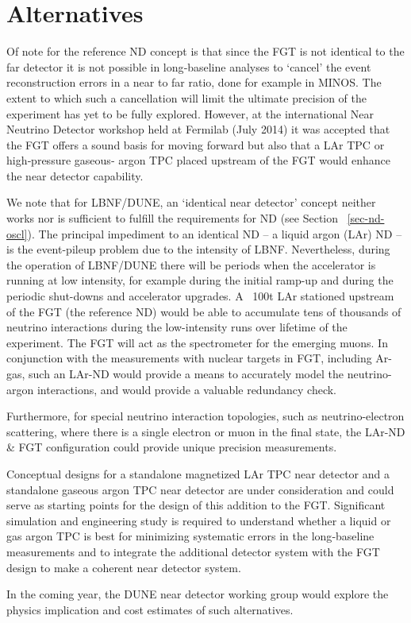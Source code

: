 \section{Alternatives}
\label{sec:detectors-nd-alt}

Of note for the reference ND concept is that since the FGT is not identical to the far detector it is not possible in long‐baseline analyses to ‘cancel’ the event reconstruction errors in a near to far ratio, done for example in MINOS. The extent to which such a cancellation will limit the ultimate precision of the experiment has yet to be fully explored. However, at the international Near Neutrino Detector workshop held at Fermilab (July 2014) it was accepted that the FGT offers a sound basis for moving forward but also that a LAr TPC or high‐pressure gaseous‐ argon TPC placed upstream of the FGT would enhance the near detector capability.


We note that for LBNF/DUNE, an `identical near detector' concept neither works nor is sufficient to fulfill the requirements for ND (see Section ~\ref{sec-nd-oscl}). The principal impediment to an identical ND -- a liquid argon (LAr) ND -- is the event-pileup problem due to the intensity of LBNF. Nevertheless, during the operation of LBNF/DUNE there will be periods when the accelerator is running at low intensity, for example during the initial ramp-up and during the periodic shut-downs and accelerator upgrades. A ~100t LAr stationed upstream of the FGT (the reference ND) would be able to accumulate tens of thousands of neutrino interactions during the low-intensity runs over lifetime of the experiment. The FGT will act as the spectrometer for the emerging muons. In conjunction with the measurements with nuclear targets in FGT, including Ar-gas, such an LAr-ND would provide a means to accurately model the neutrino-argon interactions, and would provide a valuable redundancy check. 

Furthermore, for special neutrino interaction topologies, such as neutrino-electron scattering, where there is a single electron or muon in the final state, the LAr-ND \& FGT configuration could provide unique precision measurements. 

Conceptual designs for a standalone magnetized LAr TPC near detector and a standalone gaseous argon TPC near detector are under consideration and could serve as starting points for the design of this addition to the FGT. Significant simulation and engineering study is required to understand whether a liquid or gas argon TPC is best for minimizing systematic errors in the long‐baseline measurements and to integrate the additional detector system with the FGT design to make a coherent near detector system.

In the coming year, the DUNE near detector working group would explore the physics implication and cost estimates of such alternatives. 



